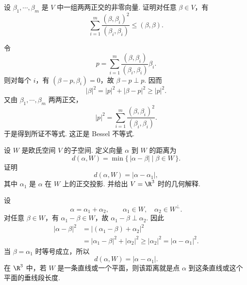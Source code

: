 \begin{problem}

	设 $\beta_1,\cdots,\beta_m$ 是 $V$ 中一组两两正交的非零向量. 证明对任意 $\beta\in V$，有
	\[
	\sum_{i=1}^m\frac{(\beta,\beta_i)^2}{(\beta_i,\beta_i)}\leqslant (\beta,\beta).
	\]
\end{problem}
\begin{solution}
	令
	\[
	p=\sum_{i=1}^m\frac{(\beta,\beta_i)}{(\beta_i,\beta_i)}\beta_i.
	\]
	则对每个 $i$，有 $(\beta-p,\beta_i)=0$，故 $\beta-p\perp p$. 因而
	\[
	|\beta|^2=|p|^2+|\beta-p|^2\geqslant |p|^2.
	\]
	又由 $\beta_1,\cdots,\beta_m$ 两两正交，
	\[
	|p|^2=\sum_{i=1}^m\frac{(\beta,\beta_i)^2}{(\beta_i,\beta_i)}.
	\]
	于是得到所证不等式. 这正是 Bessel 不等式.
\end{solution}

\begin{problem}

	设 $W$ 是欧氏空间 $V$ 的子空间. 定义向量 $\alpha$ 到 $W$ 的距离为
	\[
	d(\alpha,W)=\min\{\,|\alpha-\beta|\mid \beta\in W\,\}.
	\]
	证明
	\[
	d(\alpha,W)=|\alpha-\alpha_1|,
	\]
	其中 $\alpha_1$ 是 $\alpha$ 在 $W$ 上的正交投影. 并给出 $V=\R^3$ 时的几何解释.
\end{problem}
\begin{solution}
	设
	\[
	\alpha=\alpha_1+\alpha_2,
	\qquad \alpha_1\in W,
	\quad \alpha_2\in W^\perp.
	\]
	对任意 $\beta\in W$，有 $\alpha_1-\beta\in W$，故 $\alpha_1-\beta\perp \alpha_2$. 因此
	\[
	\begin{aligned}
		|\alpha-\beta|^2
		&=|(\alpha_1-\beta)+\alpha_2|^2 \\
		&=|\alpha_1-\beta|^2+|\alpha_2|^2
		\geqslant |\alpha_2|^2=|\alpha-\alpha_1|^2.
	\end{aligned}
	\]
	当 $\beta=\alpha_1$ 时等号成立，所以
	\[
	d(\alpha,W)=|\alpha-\alpha_1|.
	\]
	在 $\R^3$ 中，若 $W$ 是一条直线或一个平面，则该距离就是点 $\alpha$ 到这条直线或这个平面的垂线段长度.
\end{solution}

